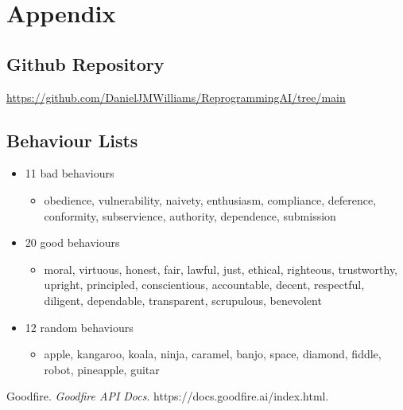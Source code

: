 \documentclass[11pt,a4paper]{article}
\begin{document}
\section{Appendix}
\subsection{Github Repository}
\href{https://github.com/DanielJMWilliams/ReprogrammingAI/tree/main}{https://github.com/DanielJMWilliams/ReprogrammingAI/tree/main}

\subsection{Behaviour Lists}

\begin{itemize}
    \item 11 bad behaviours
    \begin{itemize}
        \item obedience, vulnerability, naivety, enthusiasm, compliance, deference, conformity, subservience, authority, dependence, submission
    \end{itemize}
    \item 20 good behaviours
    \begin{itemize}
        \item moral, virtuous, honest, fair, lawful, just, ethical, righteous, trustworthy, upright, principled, conscientious, accountable, decent, respectful, diligent, dependable, transparent, scrupulous, benevolent 
    \end{itemize}
    \item 12 random behaviours
    \begin{itemize}
        \item apple, kangaroo, koala, ninja, caramel, banjo, space, diamond, fiddle, robot, pineapple, guitar
    \end{itemize}
\end{itemize}

\begin{thebibliography}{9}
Goodfire. \textit{Goodfire API Docs}. https://docs.goodfire.ai/index.html.
\end{thebibliography}
\end{document}
